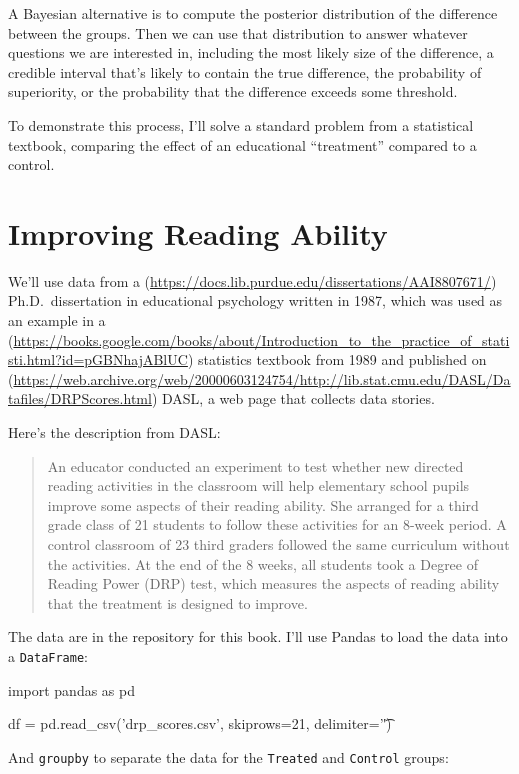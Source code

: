 \documentclass[12pt]{book}
\theoremstyle{exercise}
\newcommand{\py}[1]{{\tt #1}}%
\begin{document}
A Bayesian alternative is to compute the posterior distribution of the
difference between the groups. Then we can use that distribution to
answer whatever questions we are interested in, including the most
likely size of the difference, a credible interval that's likely to
contain the true difference, the probability of superiority, or the
probability that the difference exceeds some threshold.

To demonstrate this process, I'll solve a standard problem from a
statistical textbook, comparing the effect of an educational
``treatment'' compared to a control.

\section{Improving Reading Ability}

We'll use data from a
(\url{https://docs.lib.purdue.edu/dissertations/AAI8807671/})
Ph.D.~dissertation in educational psychology written in 1987, which was used as an example
in a
(\url{https://books.google.com/books/about/Introduction_to_the_practice_of_statisti.html?id=pGBNhajABlUC})
statistics textbook from 1989 and published on
(\url{https://web.archive.org/web/20000603124754/http://lib.stat.cmu.edu/DASL/Datafiles/DRPScores.html}) DASL,
a web page that collects data stories.

Here's the description from DASL:

\begin{quote}
An educator conducted an experiment to test whether new directed reading
activities in the classroom will help elementary school pupils improve
some aspects of their reading ability. She arranged for a third grade
class of 21 students to follow these activities for an 8-week period. A
control classroom of 23 third graders followed the same curriculum
without the activities. At the end of the 8 weeks, all students took a
Degree of Reading Power (DRP) test, which measures the aspects of
reading ability that the treatment is designed to improve.
\end{quote}

The data are in the repository for this book.
I'll use Pandas to load the data into a \py{DataFrame}:

\begin{code}
import pandas as pd

df = pd.read_csv('drp_scores.csv', skiprows=21, delimiter='\t')
\end{code}

And \py{groupby} to separate the data for the
\py{Treated} and \py{Control}
groups:
\end{document}
